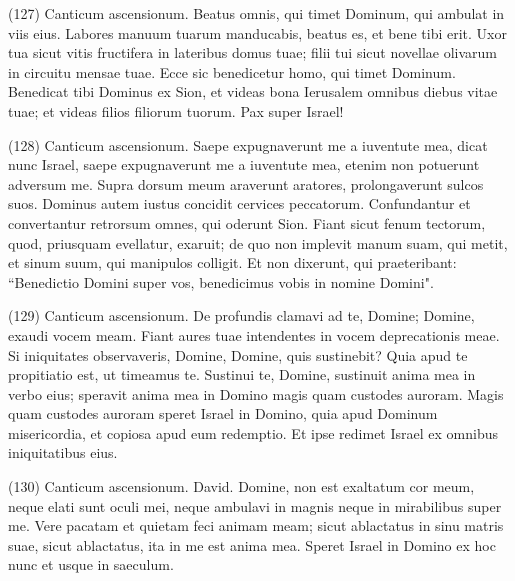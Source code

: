 \begin{biblechapter}  (127) 
\verse  Canticum ascensionum. Beatus omnis, qui timet Dominum, qui ambulat in viis eius. 
\verse Labores manuum tuarum manducabis, beatus es, et bene tibi erit. 
\verse Uxor tua sicut vitis fructifera in lateribus domus tuae; filii tui sicut novellae olivarum in circuitu mensae tuae. 
\verse Ecce sic benedicetur homo, qui timet Dominum. 
\verse Benedicat tibi Dominus ex Sion, et videas bona Ierusalem omnibus diebus vitae tuae; 
\verse et videas filios filiorum tuorum. Pax super Israel! 
\end{biblechapter}

\begin{biblechapter}  (128) 
\verse  Canticum ascensionum. Saepe expugnaverunt me a iuventute mea, dicat nunc Israel, 
\verse saepe expugnaverunt me a iuventute mea, etenim non potuerunt adversum me. 
\verse Supra dorsum meum araverunt aratores, prolongaverunt sulcos suos. 
\verse Dominus autem iustus concidit cervices peccatorum. 
\verse Confundantur et convertantur retrorsum omnes, qui oderunt Sion. 
\verse Fiant sicut fenum tectorum, quod, priusquam evellatur, exaruit; 
\verse de quo non implevit manum suam, qui metit, et sinum suum, qui manipulos colligit. 
\verse Et non dixerunt, qui praeteribant: “Benedictio Domini super vos, benedicimus vobis in nomine Domini". 
\end{biblechapter}

\begin{biblechapter}  (129) 
\verse  Canticum ascensionum. De profundis clamavi ad te, Domine; 
\verse Domine, exaudi vocem meam. Fiant aures tuae intendentes in vocem deprecationis meae. 
\verse Si iniquitates observaveris, Domine, Domine, quis sustinebit? 
\verse Quia apud te propitiatio est, ut timeamus te. 
\verse Sustinui te, Domine, sustinuit anima mea in verbo eius; speravit 
\verse anima mea in Domino magis quam custodes auroram. Magis quam custodes auroram 
\verse speret Israel in Domino, quia apud Dominum misericordia, et copiosa apud eum redemptio. 
\verse Et ipse redimet Israel ex omnibus iniquitatibus eius. 
\end{biblechapter}

\begin{biblechapter}  (130) 
\verse  Canticum ascensionum. David. Domine, non est exaltatum cor meum, neque elati sunt oculi mei, neque ambulavi in magnis neque in mirabilibus super me. 
\verse Vere pacatam et quietam feci animam meam; sicut ablactatus in sinu matris suae, sicut ablactatus, ita in me est anima mea. 
\verse Speret Israel in Domino ex hoc nunc et usque in saeculum. 
\end{biblechapter}

